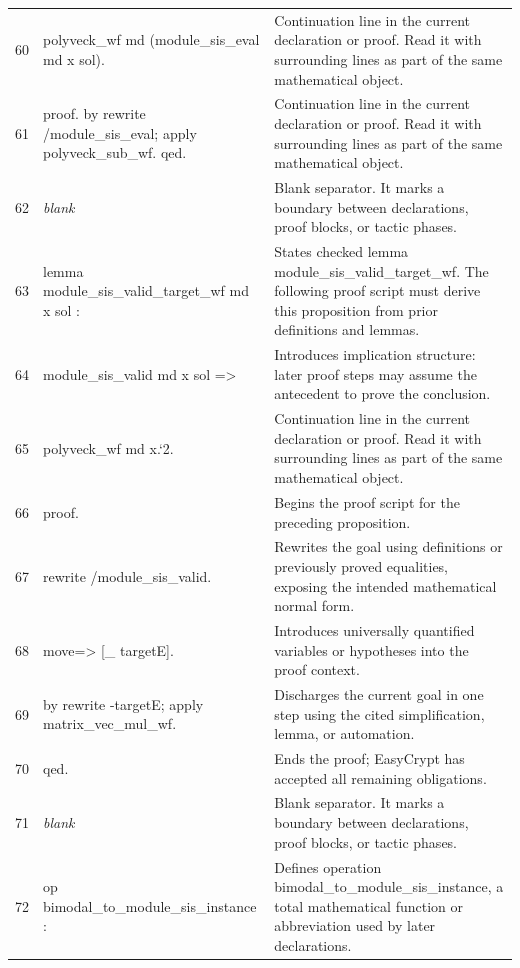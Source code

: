 \documentclass[10pt]{article}
\begin{document}
\begin{longtable}{r L{0.53\textwidth} L{0.37\textwidth}}
60 & {\ttfamily\scriptsize   polyveck\_wf md (module\_sis\_eval md x sol).} & Continuation line in the current declaration or proof.  Read it with surrounding lines as part of the same mathematical object. \\
61 & {\ttfamily\scriptsize proof. by rewrite /module\_sis\_eval; apply polyveck\_sub\_wf. qed.} & Continuation line in the current declaration or proof.  Read it with surrounding lines as part of the same mathematical object. \\
62 & {\ttfamily\scriptsize \emph{blank}} & Blank separator.  It marks a boundary between declarations, proof blocks, or tactic phases. \\
63 & {\ttfamily\scriptsize lemma module\_sis\_valid\_target\_wf md x sol :} & States checked lemma module\_sis\_valid\_target\_wf.  The following proof script must derive this proposition from prior definitions and lemmas. \\
64 & {\ttfamily\scriptsize   module\_sis\_valid md x sol =>} & Introduces implication structure: later proof steps may assume the antecedent to prove the conclusion. \\
65 & {\ttfamily\scriptsize   polyveck\_wf md x.`2.} & Continuation line in the current declaration or proof.  Read it with surrounding lines as part of the same mathematical object. \\
66 & {\ttfamily\scriptsize proof.} & Begins the proof script for the preceding proposition. \\
67 & {\ttfamily\scriptsize rewrite /module\_sis\_valid.} & Rewrites the goal using definitions or previously proved equalities, exposing the intended mathematical normal form. \\
68 & {\ttfamily\scriptsize move=> [\_ targetE].} & Introduces universally quantified variables or hypotheses into the proof context. \\
69 & {\ttfamily\scriptsize by rewrite -targetE; apply matrix\_vec\_mul\_wf.} & Discharges the current goal in one step using the cited simplification, lemma, or automation. \\
70 & {\ttfamily\scriptsize qed.} & Ends the proof; EasyCrypt has accepted all remaining obligations. \\
71 & {\ttfamily\scriptsize \emph{blank}} & Blank separator.  It marks a boundary between declarations, proof blocks, or tactic phases. \\
72 & {\ttfamily\scriptsize op bimodal\_to\_module\_sis\_instance :} & Defines operation bimodal\_to\_module\_sis\_instance, a total mathematical function or abbreviation used by later declarations. \\

\end{longtable}
\end{document}
